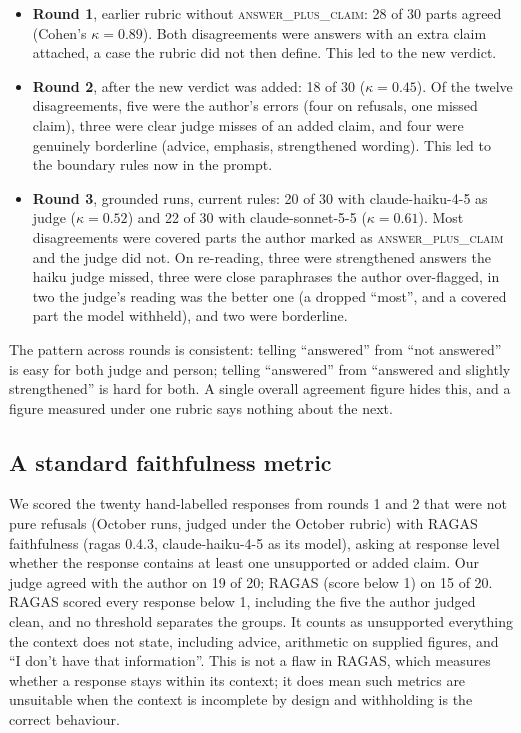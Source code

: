 \documentclass[11pt]{article}
\newcommand{\verdict}[1]{\textsc{\MakeLowercase{#1}}}
\begin{document}
\begin{itemize}
  \item \textbf{Round 1}, earlier rubric without \verdict{ANSWER\_PLUS\_CLAIM}: 28 of 30 parts agreed (Cohen's $\kappa = 0.89$). Both disagreements were answers with an extra claim attached, a case the rubric did not then define. This led to the new verdict.
  \item \textbf{Round 2}, after the new verdict was added: 18 of 30 ($\kappa = 0.45$). Of the twelve disagreements, five were the author's errors (four on refusals, one missed claim), three were clear judge misses of an added claim, and four were genuinely borderline (advice, emphasis, strengthened wording). This led to the boundary rules now in the prompt.
  \item \textbf{Round 3}, grounded runs, current rules: 20 of 30 with claude-haiku-4-5 as judge ($\kappa = 0.52$) and 22 of 30 with claude-sonnet-5-5 ($\kappa = 0.61$). Most disagreements were covered parts the author marked as \verdict{ANSWER\_PLUS\_CLAIM} and the judge did not. On re-reading, three were strengthened answers the haiku judge missed, three were close paraphrases the author over-flagged, in two the judge's reading was the better one (a dropped ``most'', and a covered part the model withheld), and two were borderline.
\end{itemize}
The pattern across rounds is consistent: telling ``answered'' from ``not answered'' is easy for both judge and person; telling ``answered'' from ``answered and slightly strengthened'' is hard for both. A single overall agreement figure hides this, and a figure measured under one rubric says nothing about the next.

\subsection{A standard faithfulness metric}
We scored the twenty hand-labelled responses from rounds 1 and 2 that were not pure refusals (October runs, judged under the October rubric) with RAGAS faithfulness \citep{es2024ragas} (ragas 0.4.3, claude-haiku-4-5 as its model), asking at response level whether the response contains at least one unsupported or added claim. Our judge agreed with the author on 19 of 20; RAGAS (score below 1) on 15 of 20. RAGAS scored every response below 1, including the five the author judged clean, and no threshold separates the groups. It counts as unsupported everything the context does not state, including advice, arithmetic on supplied figures, and ``I don't have that information''. This is not a flaw in RAGAS, which measures whether a response stays within its context; it does mean such metrics are unsuitable when the context is incomplete by design and withholding is the correct behaviour.
\end{document}
